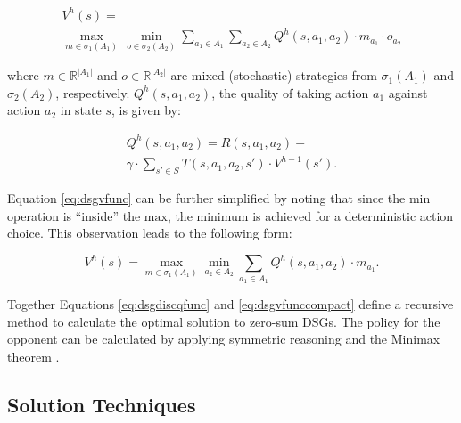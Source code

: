 \vspace{-7.5mm}
{\small

\belowdisplayskip=0pt
\begin{multline}
\label{eq:dsgvfunc}
  V^{h}(s) = \\
  \max_{m \in \sigma_1(A_1)} \hspace{2pt} \min_{o \in \sigma_2(A_2)} \sum_{a_1 \in A_1} \sum_{a_2 \in A_2} Q^{h}(s, a_1, a_2) \cdot m_{a_{1}} \cdot o_{a_{2}}
\end{multline}
}%

where $m \in \mathbb{R}^{|A_1|}$ and $o \in \mathbb{R}^{|A_2|}$ 
are mixed (stochastic) strategies from $\sigma_1(A_1)$ and
$\sigma_2(A_2)$, respectively. $Q^{h}(s, a_1, a_2)$, the quality of taking action $a_1$ against action $a_2$ in state $s$,
is given by:

\vspace{-6.5mm}
{\small 
\belowdisplayskip=0pt
\begin{multline}
\label{eq:dsgdiscqfunc}
  Q^{h}(s, a_1, a_2) = R(s, a_1, a_2) + \\
  \gamma \cdot \sum_{s' \in S} T(s, a_1, a_2, s') \cdot V^{h-1}(s').
\end{multline}
}%

Equation \eqref{eq:dsgvfunc} can be further simplified by noting that
since the $\text{min}$ operation is ``inside'' the $\text{max}$, the minimum is achieved
for a deterministic action choice. This observation leads to the following
form:

\vspace{-6.5mm}
{\small 
\begin{equation}
\label{eq:dsgvfunccompact}
  V^{h}(s) = \max_{m \in \sigma_1(A_1)} \min_{a_2 \in A_2} \sum_{a_1 \in A_1} Q^{h}(s, a_1, a_2) \cdot m_{a_1}.
\end{equation}
}%
\vspace{-6.5mm}

Together Equations \eqref{eq:dsgdiscqfunc} and \eqref{eq:dsgvfunccompact}
define a recursive method to calculate the optimal solution to zero-sum
DSGs. The policy for the opponent can be calculated by applying symmetric
reasoning and the Minimax theorem \cite{Neumann_MA_1928}. 

\subsection{Solution Techniques}
\label{subsec:dsgsolution}

